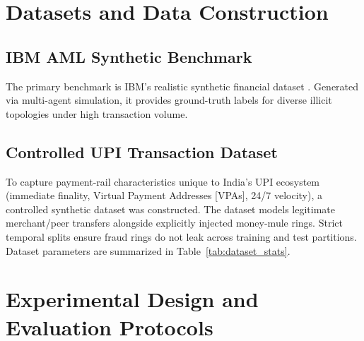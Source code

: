 \documentclass[journal]{IEEEtran}
\begin{document}
\section{Datasets and Data Construction}
\label{sec:datasets}

\subsection{IBM AML Synthetic Benchmark}
The primary benchmark is IBM's realistic synthetic financial dataset \cite{altman2023realistic}. Generated via multi-agent simulation, it provides ground-truth labels for diverse illicit topologies under high transaction volume.

\subsection{Controlled UPI Transaction Dataset}
To capture payment-rail characteristics unique to India's UPI ecosystem (immediate finality, Virtual Payment Addresses [VPAs], 24/7 velocity), a controlled synthetic dataset was constructed. The dataset models legitimate merchant/peer transfers alongside explicitly injected money-mule rings. Strict temporal splits ensure fraud rings do not leak across training and test partitions. Dataset parameters are summarized in Table~\ref{tab:dataset_stats}.

\begin{table}[t]
\centering
\caption{Benchmark Dataset Statistics}
\label{tab:dataset_stats}
\end{table}

\section{Experimental Design and Evaluation Protocols}
\label{sec:experiments}
\end{document}
